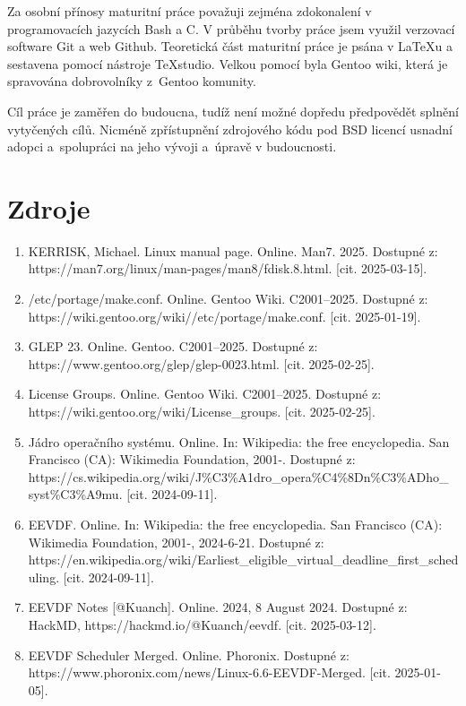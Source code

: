 \documentclass[12pt,a4paper,twoside,]{article}
\begin{document}
{{{{{{Za osobní přínosy maturitní práce považuji zejména zdokonalení v programovacích jazycích Bash a C. V průběhu tvorby práce jsem využil verzovací software Git a web Github. Teoretická část maturitní práce je psána v LaTeXu a sestavena pomocí nástroje TeXstudio. Velkou pomocí byla Gentoo wiki, která je spravována dobrovolníky z~Gentoo komunity.

Cíl práce je zaměřen do budoucna, tudíž není možné dopředu předpovědět splnění vytyčených cílů. Nicméně zpřístupnění zdrojového kódu pod BSD licencí usnadní adopci a~spolupráci na jeho vývoji a~úpravě v budoucnosti. 
\newpage
\section{\textsf{Zdroje}}
\begin{enumerate}
	\item KERRISK, Michael. Linux manual page. Online. Man7. 2025. Dostupné z: https://man7.org/linux/man-pages/man8/fdisk.8.html. [cit. 2025-03-15].
	\item /etc/portage/make.conf. Online. Gentoo Wiki. C2001–2025. Dostupné z:\\ https://wiki.gentoo.org/wiki//etc/portage/make.conf. [cit. 2025-01-19].
	\item GLEP 23. Online. Gentoo. C2001–2025. Dostupné z: \\https://www.gentoo.org/glep/glep-0023.html. [cit. 2025-02-25].
	\item License Groups. Online. Gentoo Wiki. C2001–2025. Dostupné z: \\https://wiki.gentoo.org/wiki/License\_groups. [cit. 2025-02-25].
	\item Jádro operačního systému. Online. In: Wikipedia: the free encyclopedia. San Francisco (CA): Wikimedia Foundation, 2001-. Dostupné z:\\https://cs.wikipedia.org/wiki/J\%C3\%A1dro\_opera\%C4\%8Dn\%C3\%ADho\_\\syst\%C3\%A9mu. [cit. 2024-09-11].
	\item EEVDF. Online. In: Wikipedia: the free encyclopedia. San Francisco (CA): Wikimedia Foundation, 2001-, 2024-6-21. Dostupné z:\\ https://en.wikipedia.org/wiki/Earliest\_eligible\_virtual\_deadline\_first\_scheduling. [cit. 2024-09-11].
	\item EEVDF Notes [@Kuanch]. Online. 2024, 8 August 2024. Dostupné z: HackMD, https://hackmd.io/@Kuanch/eevdf. [cit. 2025-03-12].
	\item EEVDF Scheduler Merged. Online. Phoronix. Dostupné z:\\ https://www.phoronix.com/news/Linux-6.6-EEVDF-Merged. [cit. 2025-01-05].

\end{enumerate}}}}}}}
\end{document}
